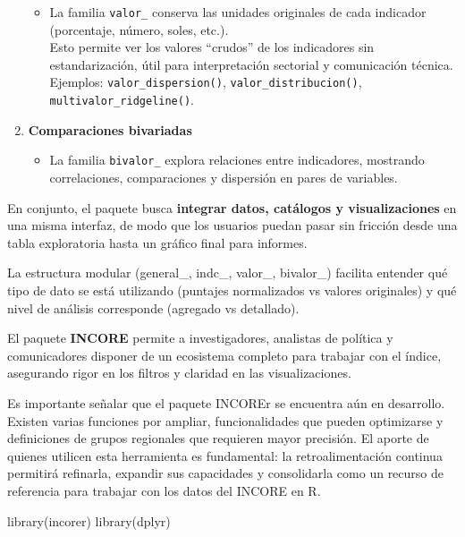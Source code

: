 \documentclass[
  11pt,
  letterpaper,
  DIV=11,
  numbers=noendperiod]{scrartcl}
\newenvironment{Shaded}{\begin{snugshade}}{\end{snugshade}}
\newcommand{\FunctionTok}[1]{\textcolor[rgb]{0.28,0.35,0.67}{#1}}
\newcommand{\NormalTok}[1]{\textcolor[rgb]{0.00,0.23,0.31}{#1}}
\providecommand{\tightlist}{%
  \setlength{\itemsep}{0pt}\setlength{\parskip}{0pt}}\usepackage{longtable,booktabs,array}
\begin{document}
\begin{enumerate}
  \begin{itemize}
  \tightlist
  \item
    La familia \texttt{valor\_} conserva las unidades originales de cada
    indicador (porcentaje, número, soles, etc.).\\
    Esto permite ver los valores ``crudos'' de los indicadores sin
    estandarización, útil para interpretación sectorial y comunicación
    técnica.\\
    Ejemplos: \texttt{valor\_dispersion()},
    \texttt{valor\_distribucion()}, \texttt{multivalor\_ridgeline()}.
  \end{itemize}
\item
  \textbf{Comparaciones bivariadas}

  \begin{itemize}
  \tightlist
  \item
    La familia \texttt{bivalor\_} explora relaciones entre indicadores,
    mostrando correlaciones, comparaciones y dispersión en pares de
    variables.
  \end{itemize}
\end{enumerate}

En conjunto, el paquete busca \textbf{integrar datos, catálogos y
visualizaciones} en una misma interfaz, de modo que los usuarios puedan
pasar sin fricción desde una tabla exploratoria hasta un gráfico final
para informes.

La estructura modular (general\_, indc\_, valor\_, bivalor\_) facilita
entender qué tipo de dato se está utilizando (puntajes normalizados vs
valores originales) y qué nivel de análisis corresponde (agregado vs
detallado).

El paquete \textbf{INCORE} permite a investigadores, analistas de
política y comunicadores disponer de un ecosistema completo para
trabajar con el índice, asegurando rigor en los filtros y claridad en
las visualizaciones.

Es importante señalar que el paquete INCOREr se encuentra aún en
desarrollo. Existen varias funciones por ampliar, funcionalidades que
pueden optimizarse y definiciones de grupos regionales que requieren
mayor precisión. El aporte de quienes utilicen esta herramienta es
fundamental: la retroalimentación continua permitirá refinarla, expandir
sus capacidades y consolidarla como un recurso de referencia para
trabajar con los datos del INCORE en R.

\begin{Shaded}
\begin{Highlighting}[]
\FunctionTok{library}\NormalTok{(incorer)}
\FunctionTok{library}\NormalTok{(dplyr)}
\end{Highlighting}
\end{Shaded}
\end{document}
